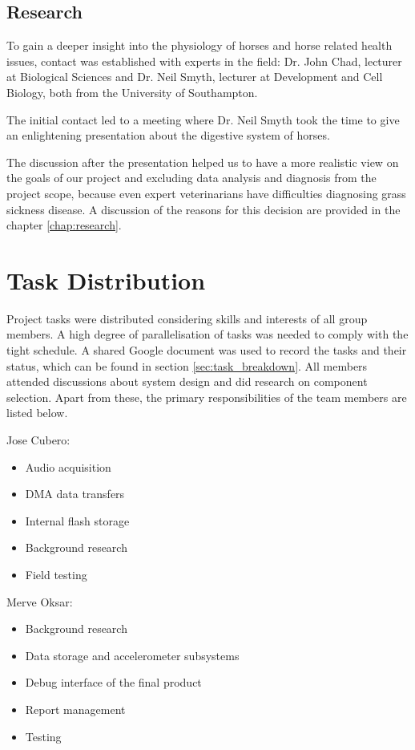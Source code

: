 \subsection{Research}
To gain a deeper insight into the physiology of horses and horse related health issues, contact was established with experts in the field: Dr. John Chad, lecturer at Biological Sciences and Dr. Neil Smyth, lecturer at Development and Cell Biology, both from the University of Southampton.

The initial contact led to a meeting where Dr. Neil Smyth took the time to give an enlightening presentation about the digestive system of horses.

The discussion after the presentation helped us to have a more realistic view on the goals of our project and excluding data analysis and diagnosis from the project scope, because even expert veterinarians have difficulties diagnosing grass sickness disease. A discussion of the reasons for this decision are provided in the chapter \ref{chap:research}.



\section{Task Distribution}
Project tasks were distributed considering skills and interests of all group members. A high degree of parallelisation of tasks was needed to comply with the tight schedule. A shared Google document was used to record the tasks and their status, which can be found in section \ref{sec:task_breakdown}. All members attended discussions about system design and did research on component selection. Apart from these, the primary responsibilities of the team members are listed below. 

Jose Cubero:
\begin{itemize}
\item Audio acquisition
\item DMA data transfers
\item Internal flash storage
\item Background research
\item Field testing
\end{itemize}

Merve Oksar:
\begin{itemize}
\item Background research
\item Data storage and accelerometer subsystems
\item Debug interface of the final product
\item Report management
\item Testing
\end{itemize}


